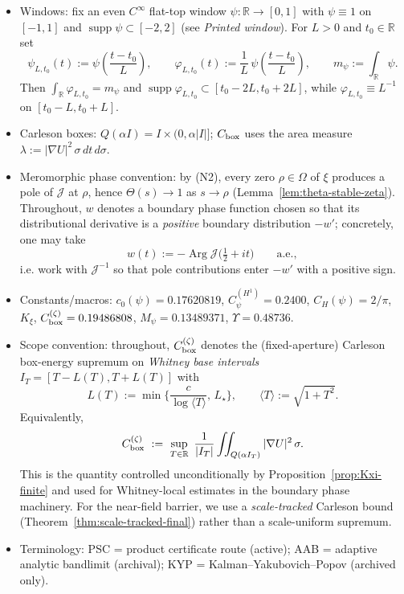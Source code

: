\documentclass[11pt]{article}
\providecommand{\czeroplateau}{0.17620819}%
\providecommand{\CboxZeta}{K_0 + K_\xi}%
\providecommand{\CHone}{2/\pi}%
\providecommand{\CpsiHone}{0.2400}%
\providecommand{\Mpsilocked}{(4/\pi)\,\CpsiHone\,\sqrt{\CboxZeta}}
\providecommand{\UpsilonLocked}{(2/\pi)\,\Mpsilocked/\czeroplateau}%
\renewcommand{\CboxZeta}{0.19486808}
\renewcommand{\Mpsilocked}{0.13489371}
\renewcommand{\UpsilonLocked}{0.48736}
\theoremstyle{definition}
\theoremstyle{remark}
\theoremstyle{definition}
\newcommand{\R}{\mathbb{R}}
\DeclareMathOperator{\Arg}{Arg}
\begin{document}
\begin{itemize}
\[
  \nu\ :=\ \sum_{\substack{\rho=\beta+i\gamma\\ \beta>1/2}} 2(\beta-\tfrac12)\,\delta_{\rho}
  \qquad\text{on }\Omega,
\]
and the associated \emph{boundary balayage} is the absolutely continuous measure $\mu$ on $\R$ with density
\[
  \frac{d\mu}{dt}(t)\ =\ \sum_{\substack{\rho=\beta+i\gamma\\ \beta>1/2}} 2(\beta-\tfrac12)\,P_{\beta-1/2}(t-\gamma).
\]
\item Windows: fix an even $C^\infty$ flat-top window $\psi:\R\to[0,1]$ with $\psi\equiv 1$ on $[-1,1]$ and $\operatorname{supp}\psi\subset[-2,2]$ (see \emph{Printed window}). For $L>0$ and $t_0\in\R$ set
\[
  \psi_{L,t_0}(t):=\psi\!\left(\frac{t-t_0}{L}\right),\qquad
  \varphi_{L,t_0}(t):=\frac{1}{L}\,\psi\!\left(\frac{t-t_0}{L}\right),\qquad
  m_\psi:=\int_\R\psi.
\]
Then $\int_\R \varphi_{L,t_0}=m_\psi$ and $\operatorname{supp}\varphi_{L,t_0}\subset[t_0-2L,t_0+2L]$, while $\varphi_{L,t_0}\equiv L^{-1}$ on $[t_0-L,t_0+L]$.
\item Carleson boxes: $Q(\alpha I)=I\times(0,\alpha|I|]$; $C_{\rm box}$ uses the area measure $\lambda:=|\nabla U|^2\,\sigma\,dt\,d\sigma$.
\item Meromorphic phase convention: by \textnormal{(N2)}, every zero $\rho\in\Omega$ of $\xi$ produces a pole of $\mathcal J$ at $\rho$, hence $\Theta(s)\to 1$ as $s\to\rho$ (Lemma~\ref{lem:theta-stable-zeta}).
Throughout, $w$ denotes a boundary phase function chosen so that its distributional derivative is a \emph{positive} boundary distribution $-w'$; concretely, one may take
\[
  w(t):=-\Arg\mathcal J\!\big(\tfrac12+it\big)\qquad\text{a.e.},
\]
i.e. work with $\mathcal J^{-1}$ so that pole contributions enter $-w'$ with a positive sign.
\item Constants/macros: $c_0(\psi)=\czeroplateau$, $C_\psi^{(H^1)}=\CpsiHone$, $C_H(\psi)=\CHone$, $K_\xi$, $C_{\rm box}^{(\zeta)}=\CboxZeta$, $M_\psi=\Mpsilocked$, $\Upsilon=\UpsilonLocked$.
\item Scope convention: throughout, $C_{\rm box}^{(\zeta)}$ denotes the (fixed-aperture) Carleson box-energy supremum on \emph{Whitney base intervals} $I_T=[T-L(T),T+L(T)]$ with
\[
  L(T):=\min\Big\{\frac{c}{\log\langle T\rangle},\,L_\star\Big\},\qquad \langle T\rangle:=\sqrt{1+T^2}.
\]
Equivalently,
\[
  C_{\rm box}^{(\zeta)}\ :=\ \sup_{T\in\R}\ \frac{1}{|I_T|}\iint_{Q(\alpha I_T)}|\nabla U|^2\,\sigma.
\]
This is the quantity controlled unconditionally by Proposition~\ref{prop:Kxi-finite} and used for Whitney-local estimates in the boundary phase machinery.
For the near-field barrier, we use a \emph{scale-tracked} Carleson bound (Theorem~\ref{thm:scale-tracked-final}) rather than a scale-uniform supremum.
\item Terminology: PSC = product certificate route (active); AAB = adaptive analytic bandlimit (archival); KYP = Kalman--Yakubovich--Popov (archived only).
\end{itemize}
\end{document}

